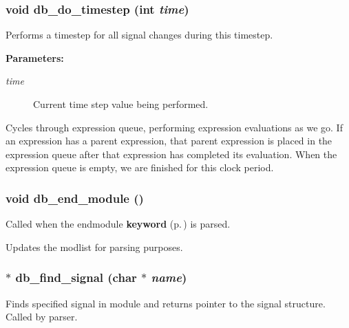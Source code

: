 \subsubsection{\setlength{\rightskip}{0pt plus 5cm}void db\_\-do\_\-timestep (int {\em time})}\label{db_8c_a42}


Performs a timestep for all signal changes during this timestep.

\begin{Desc}
\item[{\bf Parameters: }]\par
\begin{description}
\item[
{\em time}]Current time step value being performed.

\end{description}
\end{Desc}
Cycles through expression queue, performing expression evaluations as we go. If an expression has a parent expression, that parent expression is placed in the expression queue after that expression has completed its evaluation. When the expression queue is empty, we are finished for this clock period. 
\subsubsection{\setlength{\rightskip}{0pt plus 5cm}void db\_\-end\_\-module ()}\label{db_8c_a21}


Called when the endmodule {\bf keyword} {\rm (p.\,\pageref{structkeyword})} is parsed.

Updates the modlist for parsing purposes. 
\subsubsection{ $\ast$ db\_\-find\_\-signal (char $\ast$ {\em name})}\label{db_8c_a27}


Finds specified signal in module and returns pointer to the signal structure. Called by parser.

